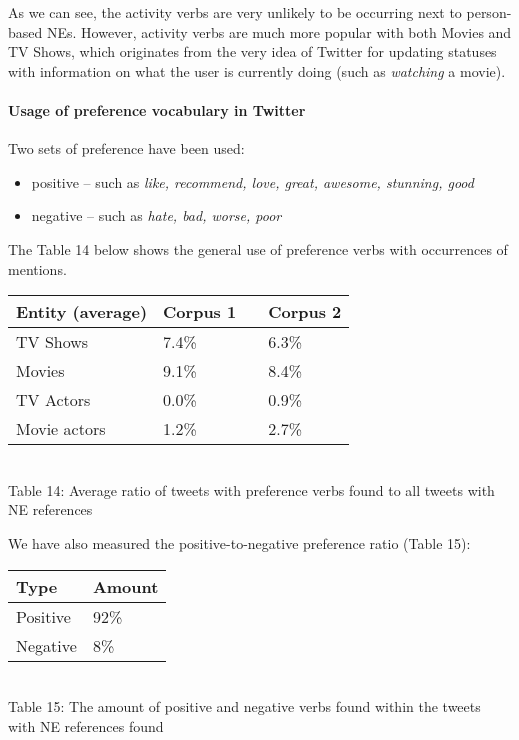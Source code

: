 As we can see, the activity verbs are very unlikely to be occurring next to
person-based NEs. However, activity verbs are much more popular with both
Movies and TV Shows, which originates from the very idea of Twitter for
updating statuses with information on what the user is currently doing (such as \textit{watching}
a movie).

\paragraph{Usage of preference vocabulary in Twitter}
Two sets of preference have been used:
\begin{itemize}
  \item positive -- such as \textit{like, recommend, love, great, awesome, stunning, good}
  \item negative -- such as \textit{hate, bad, worse, poor}
\end{itemize}

The Table 14 below shows the general use of preference verbs with occurrences of
mentions.

\begin{center}
  \begin{tabular}{ | p{4cm} | p{2cm} | p{1cm}| p{2cm} | } \hline
    Entity (average) & Corpus 1 & & Corpus 2 \\ \hline
    TV Shows & 7.4\% & & 6.3\% \\ \hline
    Movies & 9.1\% & & 8.4\% \\ \hline
    TV Actors & 0.0\% & & 0.9\% \\ \hline
    Movie actors & 1.2\% & & 2.7\% \\ \hline
  \end{tabular} \\
  Table 14: Average ratio of tweets with preference verbs found to all tweets with NE references \\
\end{center}

We have also measured the positive-to-negative preference ratio (Table 15):

\begin{center}
  \begin{tabular}{ | p{3cm}| p{2cm} | } \hline
    Type & Amount \\ \hline
    Positive & 92\% \\ \hline
    Negative & 8\% \\ \hline
  \end{tabular} \\
  Table 15: The amount of positive and negative verbs found within the tweets with NE references found \\
\end{center}

